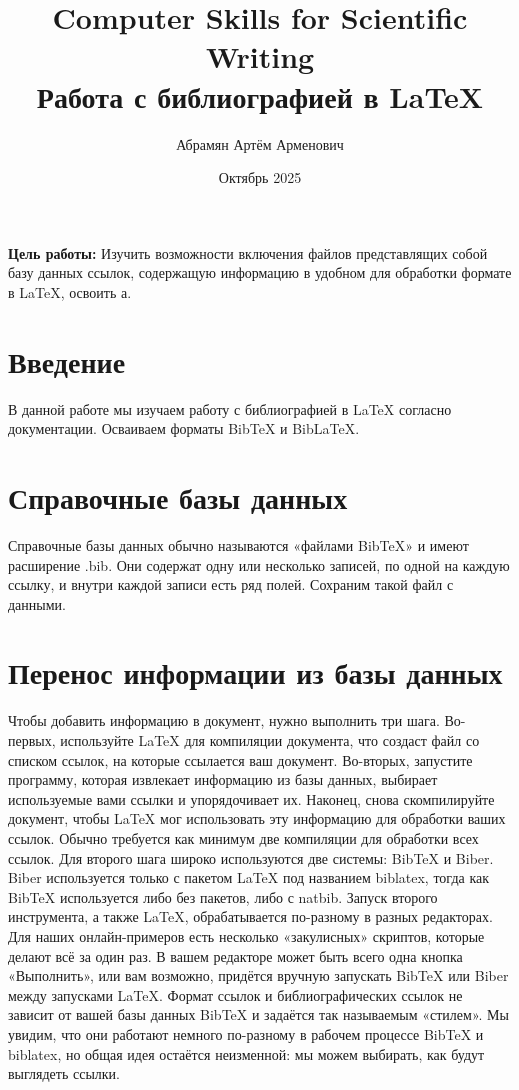 \documentclass{article}
\title{Computer Skills for Scientific Writing\\Работа с библиографией в LaTeX}
\author{Абрамян Артём Арменович}
\date{Октябрь 2025}
\begin{document}
  \maketitle
  \pagebreak

  \textbf{Цель работы:} Изучить возможности включения файлов представлящих собой базу данных ссылок, содержащую информацию в удобном для обработки формате в LaTeX, освоить а.\smallskip

  \section{Введение}
  \label{sec:intro}
  

  В данной работе мы изучаем работу с библиографией в LaTeX согласно документации. Осваиваем форматы BibTeX и BibLaTeX.

  \section{Справочные базы данных}
  \label{sec:basic}
  
  Справочные базы данных обычно называются «файлами BibTeX» и имеют расширение .bib. Они содержат одну или несколько записей, по одной на каждую ссылку, и внутри каждой записи есть ряд полей.
  Сохраним такой файл с данными.


  \section{Перенос информации из базы данных}
  \label{sec:overflow}
  
  Чтобы добавить информацию в документ, нужно выполнить три шага. Во-первых, используйте LaTeX для компиляции документа, что создаст файл со списком ссылок,
  на которые ссылается ваш документ. Во-вторых, запустите программу, которая извлекает информацию из базы данных,
  выбирает используемые вами ссылки и упорядочивает их. Наконец,
  снова скомпилируйте документ, чтобы LaTeX мог использовать эту информацию для
  обработки ваших ссылок. Обычно требуется как минимум две компиляции для обработки всех
  ссылок.
  Для второго шага широко используются две системы: BibTeX и Biber. Biber
  используется только с пакетом LaTeX под названием biblatex, тогда как BibTeX используется
  либо без пакетов, либо с natbib.
  Запуск второго инструмента, а также LaTeX, обрабатывается по-разному в разных
  редакторах. Для наших онлайн-примеров есть несколько «закулисных» скриптов, которые
  делают всё за один раз. В вашем редакторе может быть всего одна кнопка «Выполнить», или вам
  возможно, придётся вручную запускать BibTeX или Biber между запусками LaTeX.
  Формат ссылок и библиографических ссылок не зависит от вашей базы данных BibTeX и
  задаётся так называемым «стилем». Мы увидим, что они работают немного по-разному в
  рабочем процессе BibTeX и biblatex, но общая идея остаётся неизменной: мы можем выбирать,
  как будут выглядеть ссылки.
\end{document}
